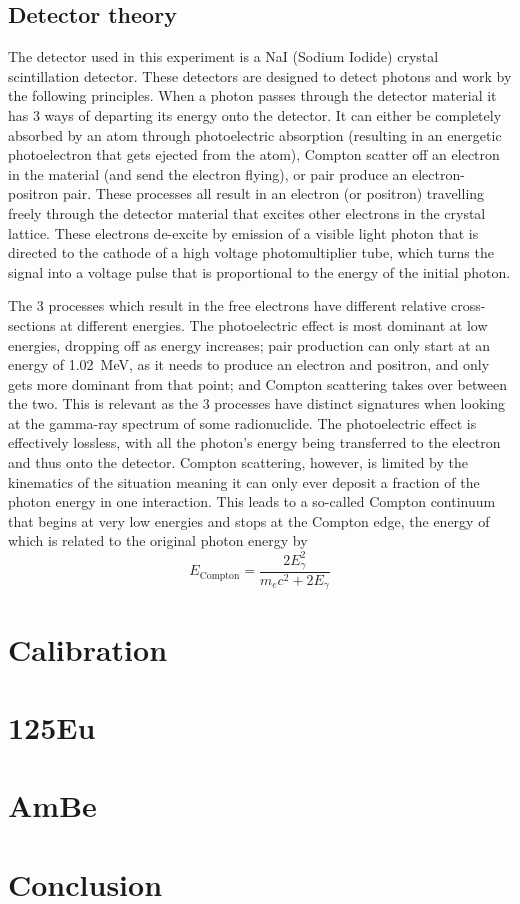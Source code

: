 \documentclass[11pt]{article}
\numberwithin{equation}{section}
\numberwithin{figure}{section}
\numberwithin{table}{section}
\begin{document}
\subsection{Detector theory}\label{sec:DetectorTheory}
The detector used in this experiment is a NaI (Sodium Iodide) crystal scintillation detector. These detectors are designed to detect photons and work by the following principles. When a photon passes through the detector material it has 3 ways of departing its energy onto the detector. It can either be completely absorbed by an atom through photoelectric absorption (resulting in an energetic photoelectron that gets ejected from the atom), Compton scatter off an electron in the material (and send the electron flying), or pair produce an electron-positron pair. These processes all result in an electron (or positron) travelling freely through the detector material that excites other electrons in the crystal lattice. These electrons de-excite by emission of a visible light photon that is directed to the cathode of a high voltage photomultiplier tube, which turns the signal into a voltage pulse that is proportional to the energy of the initial photon.

The 3 processes which result in the free electrons have different relative cross-sections at different energies. The photoelectric effect is most dominant at low energies, dropping off as energy increases; pair production can only start at an energy of \SI{1.02}{\mega\electronvolt}, as it needs to produce an electron and positron, and only gets more dominant from that point; and Compton scattering takes over between the two. This is relevant as the 3 processes have distinct signatures when looking at the gamma-ray spectrum of some radionuclide. The photoelectric effect is effectively lossless, with all the photon's energy being transferred to the electron and thus onto the detector. Compton scattering, however, is limited by the kinematics of the situation meaning it can only ever deposit a fraction of the photon energy in one interaction. This leads to a so-called Compton continuum that begins at very low energies and stops at the Compton edge, the energy of which is related to the original photon energy by 
\begin{equation}
    E_\mathrm{Compton}=\frac{2E_\gamma^2}{m_e c^2 + 2E_\gamma}
\end{equation}

\section{Calibration}\label{sec:Calibration}

\section{125Eu}\label{sec:Eu}

\section{AmBe}\label{sec:AmBe}

\section{Conclusion}\label{sec:Conclusion}
\end{document}
